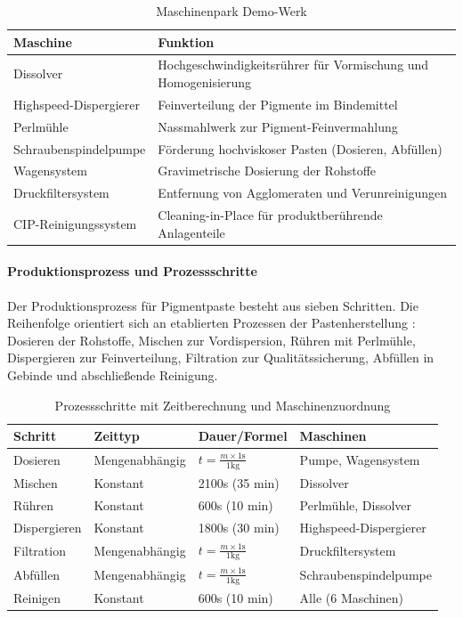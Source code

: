 \begin{table}[h]
\centering
\caption{Maschinenpark Demo-Werk}
\label{tab:Maschinen}
\begin{tabular}{lp{8cm}}
\hline
\textbf{Maschine} & \textbf{Funktion} \\
\hline
Dissolver & Hochgeschwindigkeitsrührer für Vormischung und Homogenisierung \\
Highspeed-Dispergierer & Feinverteilung der Pigmente im Bindemittel \\
Perlmühle & Nassmahlwerk zur Pigment-Feinvermahlung \\
Schraubenspindelpumpe & Förderung hochviskoser Pasten (Dosieren, Abfüllen) \\
Wagensystem & Gravimetrische Dosierung der Rohstoffe \\
Druckfiltersystem & Entfernung von Agglomeraten und Verunreinigungen \\
CIP-Reinigungssystem & Cleaning-in-Place für produktberührende Anlagenteile \\
\hline
\end{tabular}
\end{table}


\paragraph{Produktionsprozess und Prozessschritte}

Der Produktionsprozess für Pigmentpaste besteht aus sieben Schritten. Die Reihenfolge orientiert sich an etablierten Prozessen der Pastenherstellung \citep{goldschmidt:lackproduktion2019}: Dosieren der Rohstoffe, Mischen zur Vordispersion, Rühren mit Perlmühle, Dispergieren zur Feinverteilung, Filtration zur Qualitätssicherung, Abfüllen in Gebinde und abschließende Reinigung.

\begin{table}[h]
\centering
\caption{Prozessschritte mit Zeitberechnung und Maschinenzuordnung}
\label{tab:ProzessZeitberechnung}
\begin{tabular}{llll}
\hline
\textbf{Schritt} & \textbf{Zeittyp} & \textbf{Dauer/Formel} & \textbf{Maschinen} \\
\hline
Dosieren & Mengenabhängig & $t = \frac{m \times 1\text{s}}{1\text{kg}}$ & Pumpe, Wagensystem \\
Mischen & Konstant & 2100s (35 min) & Dissolver \\
Rühren & Konstant & 600s (10 min) & Perlmühle, Dissolver \\
Dispergieren & Konstant & 1800s (30 min) & Highspeed-Dispergierer \\
Filtration & Mengenabhängig & $t = \frac{m \times 1\text{s}}{1\text{kg}}$ & Druckfiltersystem \\
Abfüllen & Mengenabhängig & $t = \frac{m \times 1\text{s}}{1\text{kg}}$ & Schraubenspindelpumpe \\
Reinigen & Konstant & 600s (10 min) & Alle (6 Maschinen) \\
\hline
\end{tabular}
\end{table}


